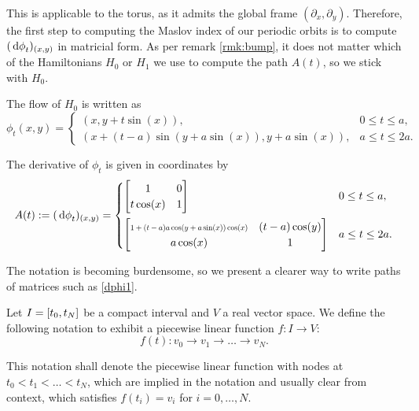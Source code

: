 This is applicable to the torus, as it admits the global frame $(\partial_x, \partial_y)$. Therefore, the first step to computing the Maslov index of our periodic orbits is to compute $(\dl \phi_t)_{(x,y)}$ in matricial form. As per remark \ref{rmk:bump}, it does not matter which of the Hamiltonians $H_0$ or $H_1$ we use to compute the path $A(t)$, so we stick with $H_0$.

The flow of $H_0$ is written as
\begin{equation}
\phi_t(x,y) = \begin{cases}
(x,y+t \sin(x)), & 0 \leq t \leq a,\\
(x+(t-a) \sin(y+a \sin(x)), y + a \sin(x)), & a \leq t \leq 2a.
\end{cases}
\end{equation}

The derivative of $\phi_t$ is given in coordinates by
\begin{equation}\label{dphi1}
A(t) := (\dl \phi_t)_{(x,y)} = \begin{cases}
\begin{bmatrix}
1 & 0\\
t \cos(x) & 1
\end{bmatrix} & 0 \leq t \leq a,\\[1.3em]
\begin{bmatrix}
\scalebox{0.7}{$1+(t-a) a \cos(y+a \sin(x)) \cos(x)$} &  (t-a) \cos(y)\\
a \cos(x) & 1
\end{bmatrix}
 & a \leq t \leq 2a.
\end{cases}
\end{equation}

The notation is becoming burdensome, so we present a clearer way to write paths of matrices such as \eqref{dphi1}.

\begin{definition}\label{def:pwlinear}
Let $I = \interval{t_0}{t_N}$ be a compact interval and $V$ a real vector space. We define the following notation to exhibit a piecewise linear function $f \colon I \to V$:
\begin{equation}
f(t) \colon v_0 \to v_1 \to \dots \to v_N.
\end{equation}

This notation shall denote the piecewise linear function with nodes at $t_0 < t_1 < \dots < t_N$, which are implied in the notation and usually clear from context, which satisfies $f(t_i) = v_i$ for $i = 0, \dots, N$.
\end{definition}


